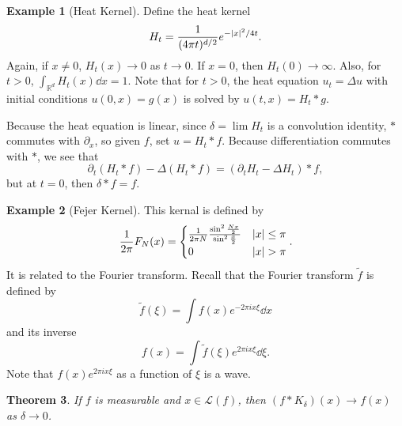 \documentclass[leqno, openany]{memoir}
\newtheorem{thm}{Theorem}[chapter]
\theoremstyle{definition}
\newtheorem{exm}[thm]{Example}
\theoremstyle{remark}
\theoremstyle{plain}
\theoremstyle{definition}
\theoremstyle{remark}
\newcommand{\R}{\mathbb{R}}
\newcommand{\mc}[1]{\mathcal{#1}}
\newcommand{\wt}[1]{\widetilde{#1}}
\begin{document}
\begin{exm}[Heat Kernel] Define the heat kernel \[ H_t = \frac{1}{(4 \pi
t)^{d/2}} e^{-\abs{x}^2/4t}. \] Again, if $x \neq 0$, $H_t(x) \to 0$ as $t \to
0$. If $x = 0$, then $H_t(0) \to \infty$. Also, for $t > 0$, $\int_{\R^d}
H_t(x) \dd{x} = 1$. Note that for $t > 0$, the heat equation $u_t = \Delta u$
with initial conditions $u(0,x) = g(x)$ is solved by $u(t,x) = H_t * g$.

    Because the heat equation is linear, since $\delta = \lim H_t$ is a
    convolution identity, $*$ commutes with $\partial_x$, so given $f$, set $u
    = H_t * f$. Because differentiation commutes with $*$, we see that \[
    \partial_t(H_t * f) - \Delta(H_t * f) = (\partial_t H_t - \Delta H_t) * f,
\] but at $t = 0$, then $\delta * f = f$.  \end{exm}

\begin{exm}[Fejer Kernel] This kernal is defined by \[ \frac{1}{2 \pi} F_N(x) =
    \begin{cases} \frac{1}{2 \pi N} \frac{\sin^2 \frac{Nx}{2}}{\sin^2
    \frac{x}{2}} & \abs{x} \leq \pi \\ 0 & \abs{x} > \pi \end{cases}. \] It is
    related to the Fourier transform. Recall that the Fourier transform
    $\wt{f}$ is defined by \[ \wt{f}(\xi) = \int f(x) e^{-2\pi i x \xi} \dd{x}
        \] and its inverse \[ f(x) = \int \wt{f}(\xi) e^{2\pi i x \xi}
    \dd{\xi}. \] Note that $f(x)e^{2 \pi i x \xi}$ as a function of $\xi$ is a
wave.  \end{exm}

\begin{thm} If $f$ is measurable and $x \in \mc{L}(f)$, then $(f *
K_{\delta})(x) \to f(x)$ as $\delta \to 0$.  \end{thm}
\end{document}
